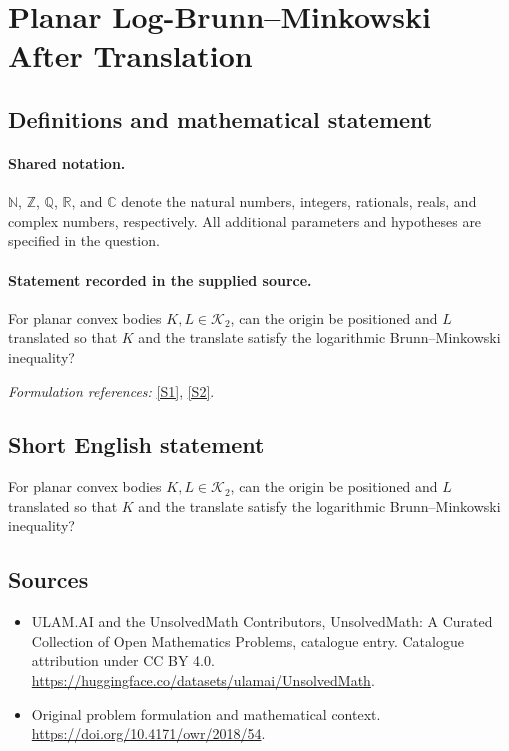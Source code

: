\documentclass[11pt]{article}
\newcommand{\sref}[2]{\hyperlink{source:#1:#2}{[S#2]}}
\begin{document}
\section{Planar Log-Brunn–Minkowski After Translation}\label{statement}

\subsection{Definitions and mathematical statement}

\paragraph{Shared notation.}$\mathbb N$, $\mathbb Z$, $\mathbb Q$, $\mathbb R$, and $\mathbb C$ denote the natural numbers, integers, rationals, reals, and complex numbers, respectively. All additional parameters and hypotheses are specified in the question.


\paragraph{Statement recorded in the supplied source.}
For planar convex bodies $K,L\in\mathcal K_2$, can the origin be positioned and $L$ translated so that $K$ and the translate satisfy the logarithmic Brunn–Minkowski inequality?
\par\smallskip\textit{Formulation references:} \sref{statement}{1}, \sref{statement}{2}.
\subsection{Short English statement}
For planar convex bodies $K,L\in\mathcal K_2$, can the origin be positioned and $L$ translated so that $K$ and the translate satisfy the logarithmic Brunn–Minkowski inequality?
\subsection{Sources}
\begin{itemize}
\item[\hypertarget{source:statement:1}{S1}] ULAM.AI and the UnsolvedMath Contributors, UnsolvedMath: A Curated Collection of Open Mathematics Problems, catalogue entry. Catalogue attribution under CC BY 4.0.
\url{https://huggingface.co/datasets/ulamai/UnsolvedMath}.
\item[\hypertarget{source:statement:2}{S2}] Original problem formulation and mathematical context.
\url{https://doi.org/10.4171/owr/2018/54}.
\end{itemize}
\label{end:statement}
\end{document}
